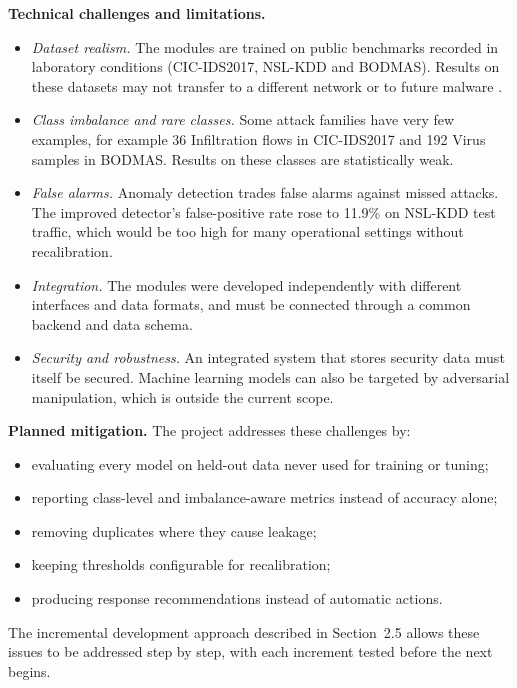 \textbf{Technical challenges and limitations.}
\begin{itemize}[itemsep=1pt, topsep=2pt]
  \item \textit{Dataset realism.} The modules are trained on public benchmarks recorded in laboratory conditions (CIC-IDS2017, NSL-KDD and BODMAS). Results on these datasets may not transfer to a different network or to future malware \cite{sommer2010outside,engelen2021troubleshooting}.
  \item \textit{Class imbalance and rare classes.} Some attack families have very few examples, for example 36 Infiltration flows in CIC-IDS2017 and 192 Virus samples in BODMAS. Results on these classes are statistically weak.
  \item \textit{False alarms.} Anomaly detection trades false alarms against missed attacks. The improved detector's false-positive rate rose to 11.9\% on NSL-KDD test traffic, which would be too high for many operational settings without recalibration.
  \item \textit{Integration.} The modules were developed independently with different interfaces and data formats, and must be connected through a common backend and data schema.
  \item \textit{Security and robustness.} An integrated system that stores security data must itself be secured. Machine learning models can also be targeted by adversarial manipulation, which is outside the current scope.
\end{itemize}

\textbf{Planned mitigation.} The project addresses these challenges by:
\begin{itemize}[itemsep=1pt, topsep=2pt]
  \item evaluating every model on held-out data never used for training or tuning;
  \item reporting class-level and imbalance-aware metrics instead of accuracy alone;
  \item removing duplicates where they cause leakage;
  \item keeping thresholds configurable for recalibration;
  \item producing response recommendations instead of automatic actions.
\end{itemize}
The incremental development approach described in Section~2.5 allows these issues to be addressed step by step, with each increment tested before the next begins.
